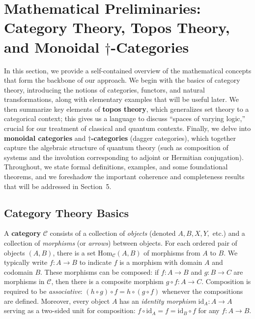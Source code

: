 \section{Mathematical Preliminaries: Category Theory, Topos Theory, and Monoidal $\dagger$-Categories}

In this section, we provide a self-contained overview of the mathematical concepts that form the backbone of our approach. We begin with the basics of category theory, introducing the notions of categories, functors, and natural transformations, along with elementary examples that will be useful later. We then summarize key elements of \textbf{topos theory}, which generalizes set theory to a categorical context; this gives us a language to discuss ``spaces of varying logic,'' crucial for our treatment of classical and quantum contexts. Finally, we delve into \textbf{monoidal categories} and \textbf{$\dagger$-categories} (dagger categories), which together capture the algebraic structure of quantum theory (such as composition of systems and the involution corresponding to adjoint or Hermitian conjugation). Throughout, we state formal definitions, examples, and some foundational theorems, and we foreshadow the important coherence and completeness results that will be addressed in Section~5.

\vspace{1em}
\subsection{Category Theory Basics}

A \textbf{category} $\mathcal{C}$ consists of a collection of \emph{objects} (denoted $A, B, X, Y,$ etc.) and a collection of \emph{morphisms} (or \emph{arrows}) between objects. For each ordered pair of objects $(A,B)$, there is a set $\mathrm{Hom}_{\mathcal{C}}(A,B)$ of morphisms from $A$ to $B$. We typically write $f: A \to B$ to indicate $f$ is a morphism with domain $A$ and codomain $B$. These morphisms can be composed: if $f: A\to B$ and $g: B \to C$ are morphisms in $\mathcal{C}$, then there is a composite morphism $g\circ f: A \to C$. Composition is required to be \textit{associative}: $(h \circ g)\circ f = h \circ (g \circ f)$ whenever the compositions are defined. Moreover, every object $A$ has an \textit{identity morphism} $\mathrm{id}_A: A \to A$ serving as a two-sided unit for composition: $f \circ \mathrm{id}_A = f = \mathrm{id}_B \circ f$ for any $f: A \to B$.


